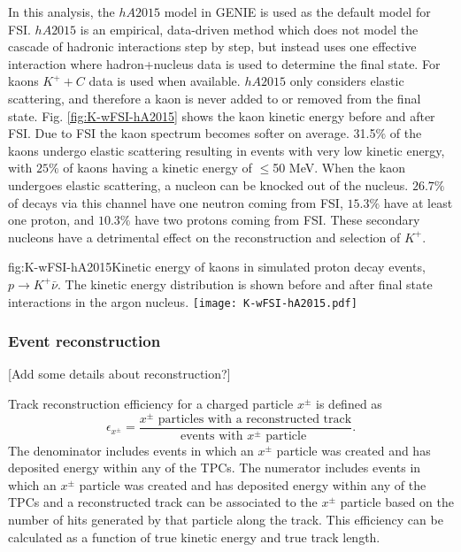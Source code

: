 In this analysis, the $hA2015$ model in GENIE is used as the default model for FSI.  $hA2015$ is an empirical, data-driven method which does not model the cascade of hadronic interactions step by step, but instead uses one effective interaction where hadron+nucleus data is used to determine the final state.  
For kaons $K^{+}+C$ data 
is used when available. $hA2015$ only considers elastic scattering, and therefore a kaon is never added to or removed from the final state. Fig. \ref{fig:K-wFSI-hA2015} shows the kaon kinetic energy before and after FSI. Due to FSI the kaon spectrum becomes softer on average. 31.5$\%$ of the kaons undergo elastic scattering resulting in events with very low kinetic energy, with $25\%$ of kaons having a kinetic energy of $\le$50 MeV. When the kaon undergoes elastic scattering, a nucleon can be knocked out of the nucleus. $26.7\%$ of decays via this channel have one neutron coming from FSI, $15.3\%$ have at least one proton, and $10.3\%$ have two protons coming from FSI. These secondary nucleons have a detrimental effect on the reconstruction and selection of $K^{+}$.

\begin{dunefigure}{fig:K-wFSI-hA2015}{Kinetic energy of kaons in simulated proton decay events, $p\rightarrow K^{+} \bar{\nu}$.  The kinetic energy distribution is shown before and after final state interactions in the argon nucleus.}
\texttt{[image: K-wFSI-hA2015.pdf]}
\end{dunefigure}


\subsubsection{Event reconstruction}
\label{sec:event-reconstruction}

[Add some details about reconstruction?]

Track reconstruction efficiency for a charged particle $x^{\pm}$ is defined as 
\begin{equation}
\epsilon_{x^{\pm}} = \frac{\mbox{$x^{\pm}$ particles with a reconstructed track}}{\mbox{events with $x^{\pm}$ particle }}.
\end{equation}
The denominator includes events in which an $x^{\pm}$ particle was created and has deposited energy within any of the TPCs.  The numerator includes events in which an $x^{\pm}$ particle was created and has deposited energy within any of the TPCs and a reconstructed track can be associated to the $x^{\pm}$ particle based on the number of hits generated by that particle along the track. This efficiency can be calculated as a function of true kinetic energy and true track length.


